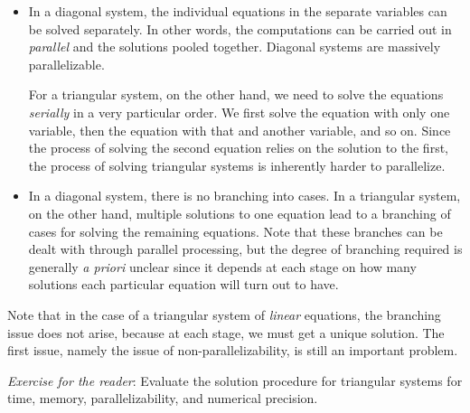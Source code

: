 \documentclass[10pt]{amsart}
\begin{document}
\begin{itemize}
\item In a diagonal system, the individual equations in the separate
  variables can be solved separately. In other words, the computations
  can be carried out in {\em parallel} and the solutions pooled
  together. Diagonal systems are massively parallelizable.

  For a triangular system, on the other hand, we need to solve the
  equations {\em serially} in a very particular order. We first solve
  the equation with only one variable, then the equation with that and
  another variable, and so on. Since the process of solving the second
  equation relies on the solution to the first, the process of solving
  triangular systems is inherently harder to parallelize.

\item In a diagonal system, there is no branching into cases. In a
  triangular system, on the other hand, multiple solutions to one
  equation lead to a branching of cases for solving the remaining
  equations. Note that these branches can be dealt with through
  parallel processing, but the degree of branching required is
  generally {\em a priori} unclear since it depends at each stage on
  how many solutions each particular equation will turn out to have.
\end{itemize}

Note that in the case of a triangular system of {\em linear}
equations, the branching issue does not arise, because at each stage,
we must get a unique solution. The first issue, namely the issue of
non-parallelizability, is still an important problem.

{\em Exercise for the reader}: Evaluate the solution procedure for
triangular systems for time, memory, parallelizability, and numerical
precision.
\end{document}

